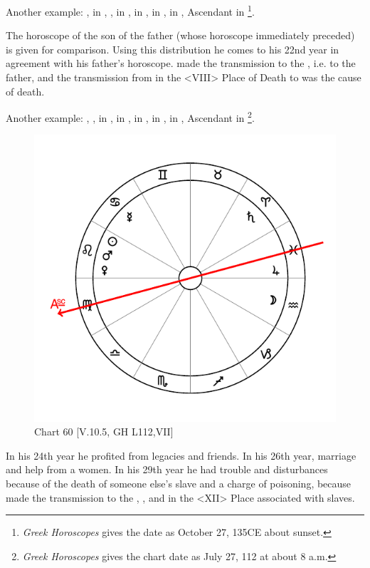 \noindent Another example: \Sun, \Mercury\xspace in \Scorpio, \Moon, \Mars\xspace in \Sagittarius, \Saturn\xspace in \Capricorn, \Jupiter\xspace in \Aquarius, \Venus\xspace in \Virgo, Ascendant in \Taurus\footnote{\textit{Greek Horoscopes} gives the date as October 27, 135CE about sunset.}. 

The horoscope of the son of the father (whose horoscope immediately preceded) is given for comparison. Using this distribution he comes to his 22nd year in agreement with his father’s horoscope. \Jupiter\xspace made the transmission to the \Sun, i.e. to the father, and the transmission from \Mars\xspace in the <VIII> Place of Death to \Venus\xspace was the cause of death.

Another example: \Sun, \Mars, \Venus\xspace in \Leo, \Moon\xspace in \Aquarius, \Saturn\xspace in \Aries, \Jupiter\xspace in \Pisces,
\Mercury\xspace in \Cancer, Ascendant in \Virgo\footnote{\textit{Greek Horoscopes} gives the chart date as July 27, 112 at about 8 a.m.}. 

\begin{figure}
\centering
\vspace{-20pt}
\includegraphics[width=.68\textwidth]{charts/5_10_05}
\caption{Chart 60 [V.10.5, GH L112,VII]}
\label{fig:chart60}
\end{figure}


In his 24th year he profited from legacies and friends. In his 26th
year, marriage and help from a women. In his 29th year he had trouble and disturbances because of the death of someone else’s slave and a charge of poisoning, because \Saturn\xspace made the transmission to the \Sun, \Mars, and \Venus\xspace in the <XII> Place associated with slaves. 


